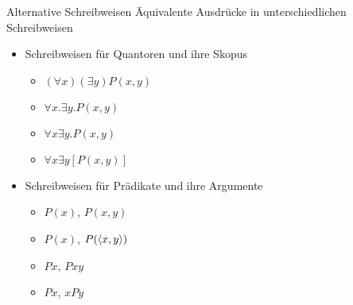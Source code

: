 \begin{frame}
  {Alternative Schreibweisen}
  \onslide<+->
  \onslide<+->
  Äquivalente Ausdrücke in unterschiedlichen Schreibweisen\\
  \Halbzeile
  \begin{itemize}[<+->]
    \item Schreibweisen für Quantoren und ihre Skopus
      \begin{itemize}[<+->]
        \item $(\forall x)(\exists y)P(x,y)$
        \item $\forall x.\exists y.P(x,y)$
        \item $\forall x\exists y.P(x,y)$
        \item $\forall x\exists y[P(x,y)]$
      \end{itemize}
      \Halbzeile
    \item Schreibweisen für Prädikate und ihre Argumente
      \begin{itemize}[<+->]
        \item $P(x)$, $P(x,y)$
        \item $P(x)$, $P(\langle{}x,y\rangle)$
        \item $Px$, $Pxy$
        \item $Px$, $xPy$
      \end{itemize}
  \end{itemize}
\end{frame}


